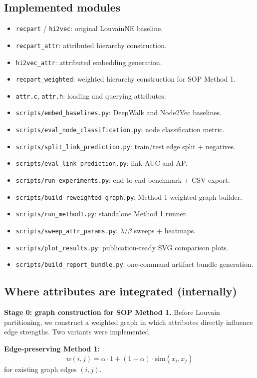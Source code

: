 \documentclass[10pt,twoside,twocolumn]{article}
\begin{document}
\subsection{Implemented modules}
\begin{itemize}
  \item \texttt{recpart} / \texttt{hi2vec}: original LouvainNE baseline.
  \item \texttt{recpart\_attr}: attributed hierarchy construction.
  \item \texttt{hi2vec\_attr}: attributed embedding generation.
  \item \texttt{recpart\_weighted}: weighted hierarchy construction for SOP Method 1.
  \item \texttt{attr.c}, \texttt{attr.h}: loading and querying attributes.
  \item \texttt{scripts/embed\_baselines.py}: DeepWalk and Node2Vec baselines.
  \item \texttt{scripts/eval\_node\_classification.py}: node classification metric.
  \item \texttt{scripts/split\_link\_prediction.py}: train/test edge split + negatives.
  \item \texttt{scripts/eval\_link\_prediction.py}: link AUC and AP.
  \item \texttt{scripts/run\_experiments.py}: end-to-end benchmark + CSV export.
  \item \texttt{scripts/build\_reweighted\_graph.py}: Method 1 weighted graph builder.
  \item \texttt{scripts/run\_method1.py}: standalone Method 1 runner.
  \item \texttt{scripts/sweep\_attr\_params.py}: $\lambda$/$\beta$ sweeps + heatmaps.
  \item \texttt{scripts/plot\_results.py}: publication-ready SVG comparison plots.
  \item \texttt{scripts/build\_report\_bundle.py}: one-command artifact bundle generation.
\end{itemize}

\subsection{Where attributes are integrated (internally)}
\textbf{Stage 0: graph construction for SOP Method 1.}
Before Louvain partitioning, we construct a weighted graph in which attributes directly influence edge strengths. Two variants were implemented.

\textbf{Edge-preserving Method 1:}
\[
w(i,j) = \alpha \cdot 1 + (1-\alpha)\cdot \mathrm{sim}(x_i, x_j)
\]
for existing graph edges $(i,j)$.
\end{document}
